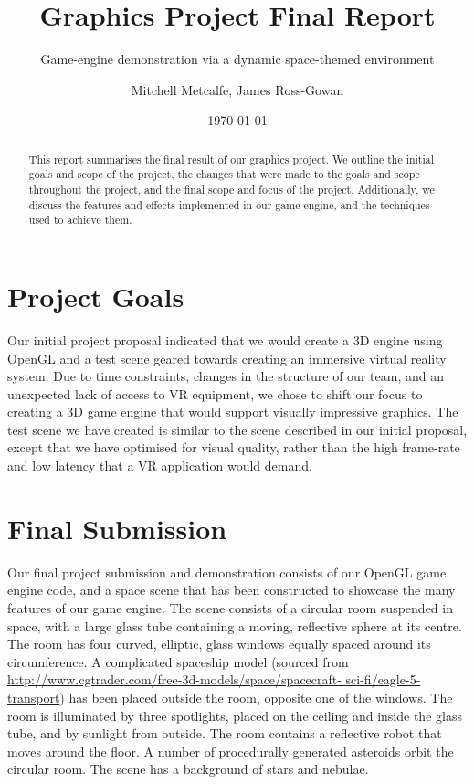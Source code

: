 \documentclass[11pt]{scrartcl} %
\title{Graphics Project Final Report}
\subtitle{Game-engine demonstration via a dynamic space-themed environment}
\author{ Mitchell Metcalfe, James Ross-Gowan }
\date{\today} %
\begin{document}
\maketitle

\begin{abstract}

    This report summarises the final result of our graphics project. We outline
    the initial goals and scope of the project, the changes that were made to
    the goals and scope throughout the project, and the final scope and focus
    of the project. Additionally, we discuss the features and effects
    implemented in our game-engine, and the  techniques used to achieve them.

\end{abstract}


\section{Project Goals}

    Our initial project proposal indicated that we would create a 3D engine
    using OpenGL and a test scene geared towards creating an immersive virtual
    reality system. Due to time constraints, changes in the structure of our
    team, and an unexpected lack of access to VR equipment, we chose to shift
    our focus to creating a 3D game engine that would support visually
    impressive graphics. The test scene we have created is similar to the scene
    described in our initial proposal, except that we have optimised for visual
    quality, rather than the high frame-rate and low latency that a VR
    application would demand.


\section{Final Submission}

    Our final project submission and demonstration consists of our OpenGL game
    engine code, and a space scene that has been constructed to showcase the
    many features of our game engine. The scene consists of a circular room
    suspended in space, with a large glass tube containing a moving, reflective
    sphere at its centre. The room has four curved, elliptic, glass windows
    equally spaced around its circumference. A complicated spaceship model
    (sourced from \url{http://www.cgtrader.com/free-3d-models/space/spacecraft-
    sci-fi/eagle-5-transport}) has been placed outside the room, opposite one
    of the windows. The room is illuminated by three spotlights, placed on the
    ceiling and inside the glass tube, and by sunlight from outside. The room
    contains a reflective robot that moves around the floor.
    A number of procedurally generated asteroids orbit the circular room.
    The scene has a background of stars and nebulae.
\end{document}
